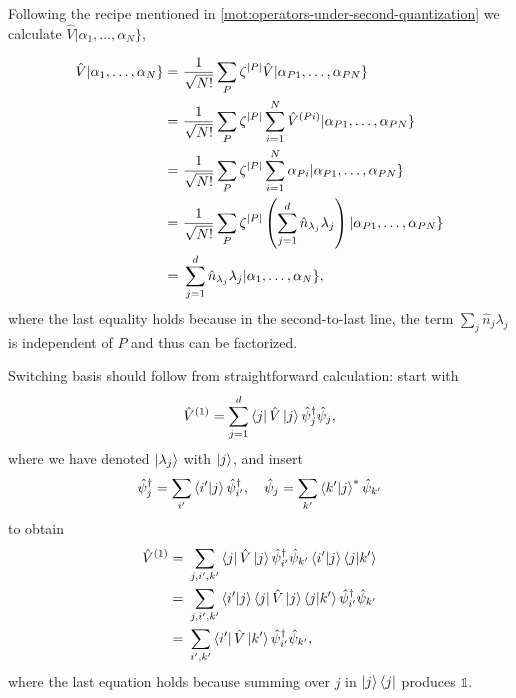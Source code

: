 \documentclass{article}
\theoremstyle{definition}
\theoremstyle{plain}
\numberwithin{equation}{section}
\begin{document}
Following the recipe mentioned 
in \cref{mot:operators-under-second-quantization}
we calculate $\hat{V}|\alpha_1, \ldots ,\alpha_{N}\}$,

\begin{align*}
    \hat{V}|\alpha_1, \ldots ,\alpha_{N}\}
    =&\ 
    \frac{1}{\sqrt{N!}}
    \sum_{P}\zeta^{\abs{P}}
    \hat{V} |\alpha_{P1}, \ldots ,\alpha_{PN}\} \\
    =&\ 
    \frac{1}{\sqrt{N!}}
    \sum_{P}\zeta^{\abs{P}}
    \sum_{i =1} ^{N}
    \hat{V}^{(Pi)}
    |\alpha_{P1}, \ldots ,\alpha_{PN}\} \\
    =&\ 
    \frac{1}{\sqrt{N!}}
    \sum_{P}\zeta^{\abs{P}}
    \sum_{i = 1}^{N}
    \alpha_{Pi} |\alpha_{P1}, \ldots ,\alpha_{PN}\} \\
    =&\ 
    \frac{1}{\sqrt{N!}}
    \sum_{P}\zeta^{\abs{P}}
    \left( 
        \sum_{j=1}^{d}
        \hat{n}_{\lambda_{j}}
        \lambda_{j}
    \right) 
    |\alpha_{P1}, \ldots ,\alpha_{PN}\} \\
    =&\ 
    \sum_{j=1}^{d}
    \hat{n}_{\lambda_{j}}
    \lambda_{j}
    |\alpha_1, \ldots ,\alpha_{N}\},
\end{align*}
where the last equality holds 
because in the second-to-last line, 
the term $\sum_{j}\hat{n}_{j}\lambda_{j}$ 
is independent of $P$ and thus can be factorized. 

Switching basis should follow from straightforward 
calculation: start with 
\[
    \hat{V}^{(1)}
    =
    \sum_{j=1}^{d}
    \bra{j} \hat{V} \ket{j}
    \hat{\psi}^{\dagger}_{j}\hat{\psi}_{j},
\]
where we have denoted 
$\ket{\lambda_{j}}$ with $\ket{j}$, 
and insert 
\[
    \hat{\psi}^{\dagger}_{j}
    =
    \sum_{i'} \bra{i'} \ket{j}
    \hat{\psi}^{\dagger}_{i'}
    ,\quad
    \hat{\psi}_{j}
    =
    \sum_{k'} \bra{k'} \ket{j} ^{*}
    \hat{\psi}_{k'}
\]
to obtain
\begin{align*}
    \hat{V}^{(1)}=&\ 
    \sum_{j,i',k'}
    \bra{j}\hat{V} \ket{j}
    \hat{\psi}^{\dagger}_{i'}\hat{\psi}_{k'}
    \bra{i'} \ket{j} \bra{j} \ket{k'}
    \\
    =&\ 
    \sum_{j,i',k'}
    \bra{i'}\ket{j}\bra{j} \hat{V} \ket{j} \bra{j} \ket{k'}
    \hat{\psi}^{\dagger}_{i'}
    \hat{\psi}_{k'}
    \\
    =&\ 
    \sum_{i',k'}
    \bra{i'} \hat{V} \ket{k'}
    \hat{\psi}^{\dagger}_{i'} \hat{\psi}_{k'},
\end{align*}
where the last equation holds because 
summing over $j$ in $\ket{j} \bra{j}$ produces $\mathds{1}$.
\end{document}
